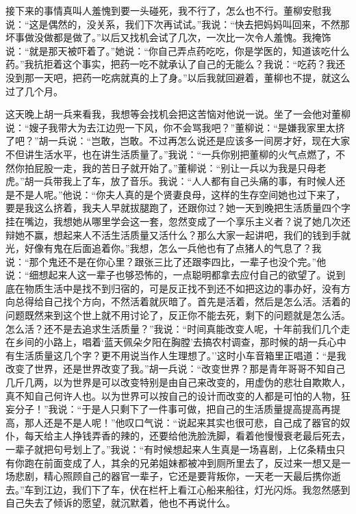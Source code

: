 \documentclass[12pt,oneside]{book}
\begin{document}
接下来的事情真叫人羞愧到要一头碰死，我不行了，怎么也不行。董柳安慰我说：``这是偶然的，没关系，我们下次再试试。''我说：``快去把妈妈叫回来，不然那坏事做没做都是做了。''以后又找机会试了几次，一次比一次令人羞愧。我掩饰说：``就是那天被吓着了。''她说：``你自己弄点药吃吃，你是学医的，知道该吃什么药。''我抗拒着这个事实，把药一吃不就承认了自己的无能么？我说：``吃药？我还没到那一天吧，把药一吃病就真的上了身。''以后我就回避着，董柳也不提，就这么过了几个月。

这天晚上胡一兵来看我，我想等会找机会把这苦恼对他说一说。坐了一会他对董柳说：``嫂子我带大为去江边兜一下风，你不会骂我吧？''董柳说：``是嫌我家里太挤了吧？''胡一兵说：``岂敢，岂敢。不过再怎么说还是应该多一间房才好，现在大家不但讲生活水平，也在讲生活质量了。''我说：``一兵你别把董柳的火气点燃了，不然你拍屁股一走，我的苦日子就开始了。''董柳说：``别让一兵以为我是只母老虎。''胡一兵带我上了车，放了音乐。我说：``人人都有自己头痛的事，有时候人还是不是人呢。''他说：``你夫人真的是个贤妻良母，这样的生存空间她也过下来了，要是我这么挤着，我夫人早就拔腿跑了，还跟你过？她一天到晚把生活质量四个字挂在嘴边，我想她从哪里学会这一套，忽然变成了一个享乐主义者？说了她几次还辩她不赢，想起来人不活生活质量又活什么？那么大家一起讲吧，我们的钱到手就光，好像有鬼在后面追着你。''我想，怎么一兵他也有了点猪人的气息了？我说：``那个鬼还不是在你心里？跟张三比了还跟李四比，一辈子也没个完。''他说：``细想起来人这一辈子也够恐怖的，一点聪明都拿去应付自己的欲望了。说到底在物质生活中是找不到归宿的，可是反正找不到还不如把这边的事办好，没有方向总得给自己找个方向，不然活着就灰暗了。首先是活着，然后是怎么活。活着的问题既然来到这个世上就不用讨论了，反正你不能去死，剩下的问题就是怎么活。怎么活？还不是去追求生活质量？''我说：``时间真能改变人呢，十年前我们几个走在乡间的小路上，唱着`蓝天佩朵夕阳在胸膛'去搞农村调查，那时候的胡一兵心中有生活质量这几个字？更不用说当作人生理想了。''这时小车音箱里正唱道：``是我改变了世界，还是世界改变了我。''胡一兵说：``改变世界？那是青年哥哥不知自己几斤几两，以为世界是可以改变特别是由自己来改变的，用虚伪的悲壮自欺欺人，真不知自己何许人也。以为世界可以按自己的设计而改变的人都是可怕的人物，狂妄分子！''我说：``于是人只剩下了一件事可做，把自己的生活质量提高提高再提高，那人还是不是人呢！''他叹口气说：``说起来其实也很可悲，自己成了器官的奴仆，每天给主人挣钱弄香的辣的，还要给他洗脸洗脚，看着他慢慢衰老最后死去，一辈子就把句号划上了。''我说：``有时候想起来人生真是一场喜剧，上亿条精虫只有你跑在前面变成了人，其余的兄弟姐妹都被冲到厕所里去了，反过来一想又是一场悲剧，精心照顾自己的器官一辈子，它还是要背叛你，一天老一天最后携你逝去。''车到江边，我们下了车，伏在栏杆上看江心船来船往，灯光闪烁。我忽然感到自己失去了倾诉的愿望，就沉默着，他也不再说什么。
\end{document}
